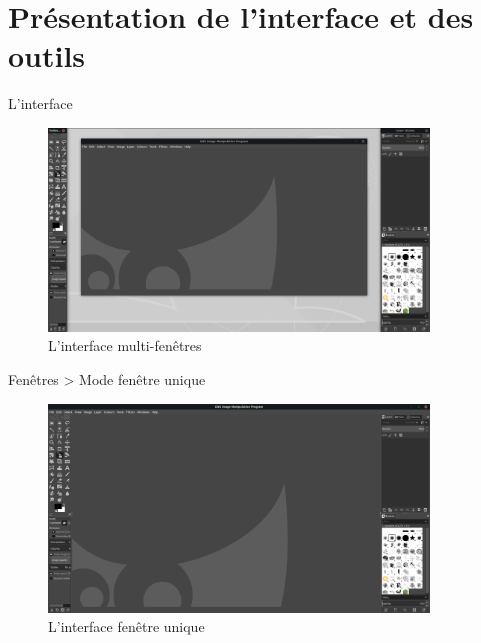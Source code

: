 \documentclass[10pt,svgnames,usenames,table]{beamer}
\begin{document}
\section{Présentation de l'interface et des outils}
\begin{frame}[allowframebreaks]{L'interface}
	\begin{figure}
	    \centering
	    \includegraphics[width=0.9\textwidth]{Images/gimp_multiple_windows}
	    \caption{L'interface multi-fenêtres}
	\end{figure} 
	\framebreak
	\begin{center}
	    Fenêtres > Mode fenêtre unique
	    \begin{figure}
	        \includegraphics[width=0.9\textwidth]{Images/gimp_single_window}
	        \caption{L'interface fenêtre unique}
	    \end{figure}
	\end{center}
\end{frame}
\end{document}
